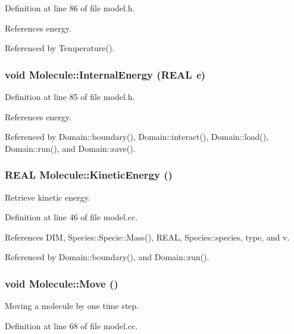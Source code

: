 Definition at line 86 of file model.h.

References energy.

Referenced by Temperature().\hypertarget{classMolecule_44c2aad65d094a675610e1966e268031}{
\subsubsection[{InternalEnergy}]{\setlength{\rightskip}{0pt plus 5cm}void Molecule::InternalEnergy (REAL {\em e})}}
\label{classMolecule_44c2aad65d094a675610e1966e268031}




Definition at line 85 of file model.h.

References energy.

Referenced by Domain::boundary(), Domain::interact(), Domain::load(), Domain::run(), and Domain::save().\hypertarget{classMolecule_2b5eba8c03b1496587754b9b5b407064}{
\subsubsection[{KineticEnergy}]{\setlength{\rightskip}{0pt plus 5cm}REAL Molecule::KineticEnergy ()}}
\label{classMolecule_2b5eba8c03b1496587754b9b5b407064}


Retrieve kinetic energy. 



Definition at line 46 of file model.cc.

References DIM, Species::Specie::Mass(), REAL, Species::species, type, and v.

Referenced by Domain::boundary(), and Domain::run().\hypertarget{classMolecule_328a0ac9cc33a1a6e2c1e17087eb4762}{
\subsubsection[{Move}]{\setlength{\rightskip}{0pt plus 5cm}void Molecule::Move ()}}
\label{classMolecule_328a0ac9cc33a1a6e2c1e17087eb4762}


Moving a molecule by one time step. 



Definition at line 68 of file model.cc.

